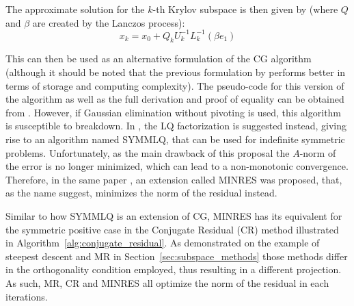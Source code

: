\noindent The approximate solution for the $k$-th Krylov subspace is then given by (where $Q$ and $\beta$ are created by the Lanczos process):
\begin{equation}
    x_k = x_0 + Q_kU_k^{-1}L_k^{-1}(\beta e_1)
\end{equation}

\noindent This can then be used as an alternative formulation of the CG algorithm (although it should be noted that the previous formulation by \cite{hestenes_methods_1952} performs better in terms of storage and computing complexity). The pseudo-code for this version of the algorithm as well as the full derivation and proof of equality can be obtained from \cite{saad_iterative_2003}. However, if Gaussian elimination without pivoting is used, this algorithm is susceptible to breakdown. In \cite{paige_solution_1975}, the LQ factorization is suggested instead, giving rise to an algorithm named SYMMLQ, that can be used for indefinite symmetric problems. Unfortunately, as the main drawback of this proposal the $A$-norm of the error is no longer minimized, which can lead to a non-monotonic convergence. Therefore, in the same paper \cite{paige_solution_1975}, an extension called MINRES was proposed, that, as the name suggest, minimizes the norm of the residual instead.

Similar to how SYMMLQ is an extension of CG, MINRES has its equivalent for the symmetric positive case in the Conjugate Residual (CR) method illustrated in Algorithm~\hyperref[alg:conjugate_residual]{\ref{alg:conjugate_residual}}. As demonstrated on the example of steepest descent and MR in Section~\hyperref[sec:subspace_methods]{\ref{sec:subspace_methods}} those methods differ in the orthogonality condition employed, thus resulting in a different projection. As such, MR, CR and MINRES all optimize the norm of the residual in each iterations.


